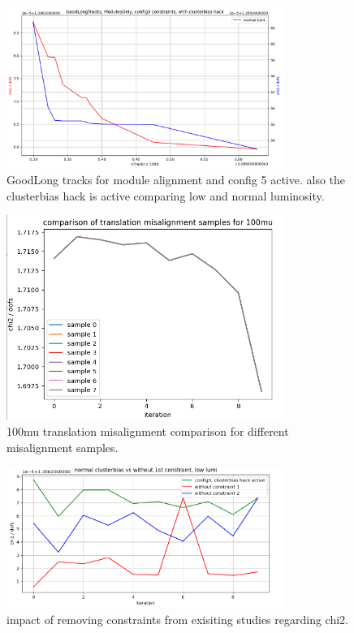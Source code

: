 \begin{figure}
  \centering
  \includegraphics[width=0.8\textwidth]{plots/feb_2_2022/GL_modules_c5_cb_hackactive_low_normal_lumi.png}
  \caption{GoodLong tracks for module alignment and config 5 active. also the clusterbias hack is active comparing low and normal luminosity.}
  \label{fig:GL_lumi_low_normal_hack_on}
\end{figure}

\begin{figure}
  \centering
  \includegraphics[width=0.8\textwidth]{plots/feb_6_2022/100mu_misalignment_samples_compared.png}
  \caption{100mu translation misalignment comparison for different misalignment samples.}
  \label{fig:100muT}
\end{figure}

\begin{figure}
  \centering
  \includegraphics[width=0.8\textwidth]{plots/feb_6_2022/low_lumi_removed_constraints_vs_normal.png}
  \caption{impact of removing constraints from exisiting studies regarding chi2.}
  \label{fig:removeConst}
\end{figure}

